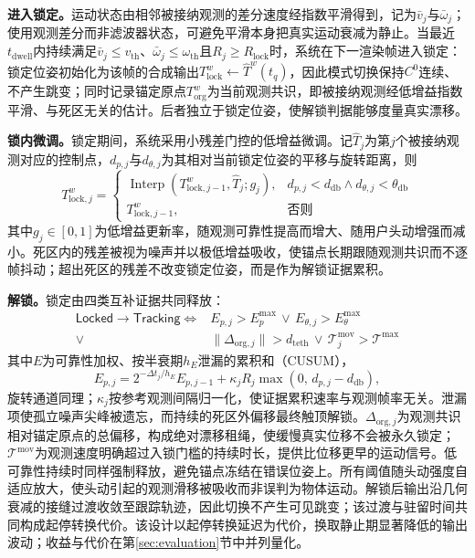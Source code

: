 \documentclass[review]{vgtc}
\begin{document}
\textbf{进入锁定。}运动状态由相邻被接纳观测的差分速度经指数平滑得到，记为$\bar{v}_j$与$\bar{\omega}_j$；使用观测差分而非滤波器状态，可避免平滑本身把真实运动衰减为静止。当最近$t_{\mathrm{dwell}}$内持续满足$\bar{v}_j \leq v_{\mathrm{th}}$、$\bar{\omega}_j \leq \omega_{\mathrm{th}}$且$R_j \geq R_{\mathrm{lock}}$时，系统在下一渲染帧进入锁定：锁定位姿初始化为该帧的合成输出$T_{\mathrm{lock}}^w \leftarrow \widehat{T}^w(t_q)$，因此模式切换保持$C^0$连续、不产生跳变；同时记录锚定原点$T_{\mathrm{org}}^w$为当前观测共识，即被接纳观测经低增益指数平滑、与死区无关的估计。后者独立于锁定位姿，使解锁判据能够度量真实漂移。

\textbf{锁内微调。}锁定期间，系统采用小残差门控的低增益微调。记$\widehat{T}_j$为第$j$个被接纳观测对应的控制点，$d_{p,j}$与$d_{\theta,j}$为其相对当前锁定位姿的平移与旋转距离，则
\begin{equation}
T_{\mathrm{lock},j}^w = \begin{cases}
\operatorname{Interp}\!\left(T_{\mathrm{lock},j-1}^w, \widehat{T}_j; g_j\right), & d_{p,j} < d_{\mathrm{db}} \wedge d_{\theta,j} < \theta_{\mathrm{db}} \\
T_{\mathrm{lock},j-1}^w, & \text{否则}
\end{cases}
\label{eq:lock-creep}
\end{equation}
其中$g_j \in [0,1]$为低增益更新率，随观测可靠性提高而增大、随用户头动增强而减小。死区内的残差被视为噪声并以极低增益吸收，使锚点长期跟随观测共识而不逐帧抖动；超出死区的残差不改变锁定位姿，而是作为解锁证据累积。

\textbf{解锁。}锁定由四类互补证据共同释放：
\begin{equation}
\begin{aligned}
\mathsf{Locked} \to \mathsf{Tracking} \iff{}
& E_{p,j} > E_p^{\max} \,\vee\, E_{\theta,j} > E_\theta^{\max} \\
\vee{}\;\; & \lVert \Delta_{\mathrm{org},j} \rVert > d_{\mathrm{teth}} \,\vee\, \mathcal{T}_j^{\mathrm{mov}} > \mathcal{T}^{\max}
\end{aligned}
\label{eq:unlock}
\end{equation}
其中$E$为可靠性加权、按半衰期$h_E$泄漏的累积和（CUSUM），
\begin{equation}
E_{p,j} = 2^{-\Delta t_j / h_E} E_{p,j-1} + \kappa_j R_j \max\!\left(0,\, d_{p,j} - d_{\mathrm{db}}\right),
\label{eq:cusum}
\end{equation}
旋转通道同理；$\kappa_j$按参考观测间隔归一化，使证据累积速率与观测帧率无关。泄漏项使孤立噪声尖峰被遗忘，而持续的死区外偏移最终触顶解锁。$\Delta_{\mathrm{org},j}$为观测共识相对锚定原点的总偏移，构成绝对漂移租绳，使缓慢真实位移不会被永久锁定；$\mathcal{T}^{\mathrm{mov}}$为观测速度明确超过入锁门槛的持续时长，提供比位移更早的运动信号。低可靠性持续时同样强制释放，避免锚点冻结在错误位姿上。所有阈值随头动强度自适应放大，使头动引起的观测滑移被吸收而非误判为物体运动。解锁后输出沿几何衰减的接缝过渡收敛至跟踪轨迹，因此切换不产生可见跳变；该过渡与驻留时间共同构成起停转换代价。该设计以起停转换延迟为代价，换取静止期显著降低的输出波动；收益与代价在第\ref{sec:evaluation}节中并列量化。
\end{document}
